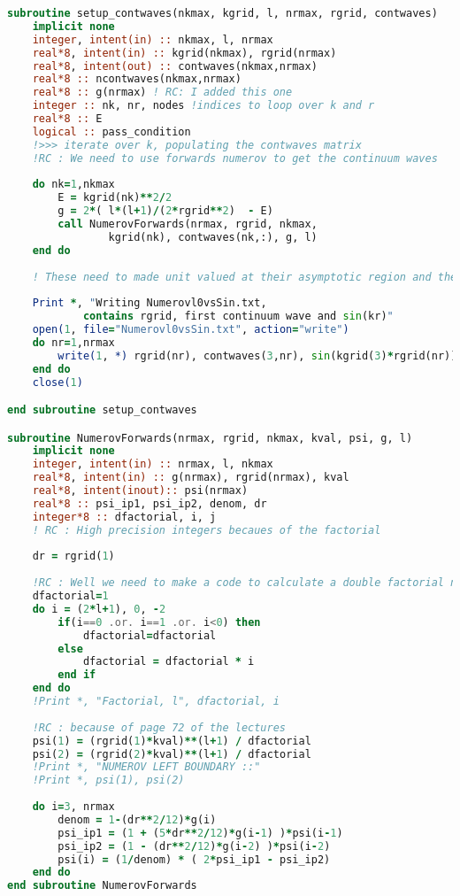 \documentclass{article}
\begin{document}
    \begin{lstlisting}[language=fortran]
subroutine setup_contwaves(nkmax, kgrid, l, nrmax, rgrid, contwaves)
	implicit none
	integer, intent(in) :: nkmax, l, nrmax
	real*8, intent(in) :: kgrid(nkmax), rgrid(nrmax)
	real*8, intent(out) :: contwaves(nkmax,nrmax)
	real*8 :: ncontwaves(nkmax,nrmax)
	real*8 :: g(nrmax) ! RC: I added this one
	integer :: nk, nr, nodes !indices to loop over k and r
	real*8 :: E
	logical :: pass_condition 
	!>>> iterate over k, populating the contwaves matrix                                 
	!RC : We need to use forwards numerov to get the continuum waves
	
	do nk=1,nkmax
		E = kgrid(nk)**2/2
		g = 2*( l*(l+1)/(2*rgrid**2)  - E)
		call NumerovForwards(nrmax, rgrid, nkmax, 
				kgrid(nk), contwaves(nk,:), g, l) 
	end do
	
	! These need to made unit valued at their asymptotic region and then normalise
	
	Print *, "Writing Numerovl0vsSin.txt, 
			contains rgrid, first continuum wave and sin(kr)" 
	open(1, file="Numerovl0vsSin.txt", action="write")
	do nr=1,nrmax
		write(1, *) rgrid(nr), contwaves(3,nr), sin(kgrid(3)*rgrid(nr))
	end do
	close(1)

end subroutine setup_contwaves

subroutine NumerovForwards(nrmax, rgrid, nkmax, kval, psi, g, l)
	implicit none 
	integer, intent(in) :: nrmax, l, nkmax
	real*8, intent(in) :: g(nrmax), rgrid(nrmax), kval 
	real*8, intent(inout):: psi(nrmax)
	real*8 :: psi_ip1, psi_ip2, denom, dr
	integer*8 :: dfactorial, i, j 
	! RC : High precision integers becaues of the factorial
	
	dr = rgrid(1)
	
	!RC : Well we need to make a code to calculate a double factorial now
	dfactorial=1
	do i = (2*l+1), 0, -2
		if(i==0 .or. i==1 .or. i<0) then
			dfactorial=dfactorial
		else
			dfactorial = dfactorial * i
		end if
	end do
	!Print *, "Factorial, l", dfactorial, i
	
	!RC : because of page 72 of the lectures
	psi(1) = (rgrid(1)*kval)**(l+1) / dfactorial 
	psi(2) = (rgrid(2)*kval)**(l+1) / dfactorial
	!Print *, "NUMEROV LEFT BOUNDARY ::"
	!Print *, psi(1), psi(2)
	
	do i=3, nrmax 
		denom = 1-(dr**2/12)*g(i)
		psi_ip1 = (1 + (5*dr**2/12)*g(i-1) )*psi(i-1)
		psi_ip2 = (1 - (dr**2/12)*g(i-2) )*psi(i-2)
		psi(i) = (1/denom) * ( 2*psi_ip1 - psi_ip2)
	end do
end subroutine NumerovForwards    	
    \end{lstlisting}
    
\end{document}
